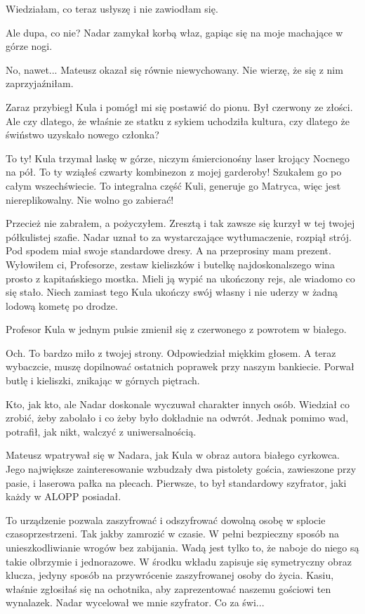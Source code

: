 Wiedziałam, co teraz usłyszę i nie zawiodłam się.

\ds{} Ale dupa, co nie? \dm{} Nadar zamykał korbą właz, gapiąc się na moje machające w górze nogi. \de{}

\ds{} No, nawet... \dm{} Mateusz okazał się równie niewychowany. Nie wierzę, że się z nim zaprzyjaźniłam. \de{}

Zaraz przybiegł Kula i pomógł mi się postawić do pionu. Był czerwony ze złości.
Ale czy dlatego, że właśnie ze statku z sykiem uchodziła kultura, czy dlatego że świństwo uzyskało nowego członka?

\ds{} To ty! \dm{} Kula trzymał laskę w górze, niczym śmiercionośny laser krojący Nocnego na pół. \dm{} To ty wziąłeś czwarty kombinezon z mojej garderoby! Szukałem go po całym wszechświecie. To integralna część Kuli, generuje go Matryca, więc jest niereplikowalny. Nie wolno go zabierać! \de{}

\ds{} Przecież nie zabrałem, a pożyczyłem. Zresztą i tak zawsze się kurzył w tej twojej półkulistej szafie. \dm{}
Nadar uznał to za wystarczające wytłumaczenie, rozpiął strój. Pod spodem miał swoje standardowe dresy. \dm{} 
A na przeprosiny mam prezent. Wyłowiłem ci, Profesorze, zestaw kieliszków i butelkę najdoskonalszego wina prosto z kapitańskiego mostka.
Mieli ją wypić na ukończony rejs, ale wiadomo co się stało. Niech zamiast tego Kula ukończy swój własny i nie uderzy w żadną lodową kometę po drodze. \de{}

Profesor Kula w jednym pulsie zmienił się z czerwonego z powrotem w białego.

\ds{} Och. To bardzo miło z twojej strony. \dm{} Odpowiedział miękkim głosem. \dm{} A teraz wybaczcie, muszę dopilnować ostatnich poprawek przy naszym bankiecie. \dm{}
Porwał butlę i kieliszki, znikając w górnych piętrach.

Kto, jak kto, ale Nadar doskonale wyczuwał charakter innych osób.
Wiedział co zrobić, żeby zabolało i co żeby było dokładnie na odwrót.
Jednak pomimo wad, potrafił, jak nikt, walczyć z uniwersalnością.

Mateusz wpatrywał się w Nadara, jak Kula w obraz autora białego cyrkowca.
Jego największe zainteresowanie wzbudzały dwa pistolety gościa, zawieszone przy pasie, i laserowa pałka na plecach.
Pierwsze, to był standardowy szyfrator, jaki każdy w ALOPP posiadał.

\ds{} To urządzenie pozwala zaszyfrować i odszyfrować dowolną osobę w splocie czasoprzestrzeni.
Tak jakby zamrozić w czasie.
W pełni bezpieczny sposób na unieszkodliwianie wrogów bez zabijania.
Wadą jest tylko to, że naboje do niego są takie olbrzymie i jednorazowe.
W środku wkładu zapisuje się symetryczny obraz klucza, jedyny sposób na przywrócenie zaszyfrowanej osoby do życia.
Kasiu, właśnie zgłosiłaś się na ochotnika, aby zaprezentować naszemu gościowi ten wynalazek. \dm{} Nadar wycelował we mnie szyfrator. Co za świ...

